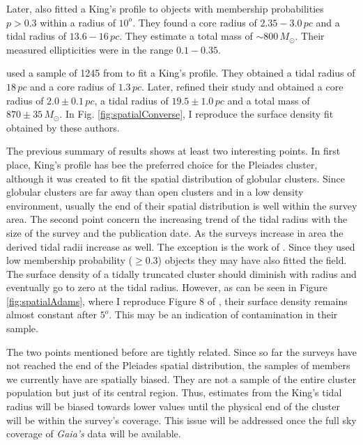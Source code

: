 Later, \citet{Adams2001} also fitted a King's profile to objects with membership probabilities $p>0.3$ within a radius of $10^o$. They found a core radius of $2.35-3.0\,pc$ and a tidal radius of $13.6-16\,pc$. They estimate a total mass of $\sim 800\,M_{\odot}$. Their measured ellipticities were in the range $0.1-0.35$. 

\citet{Converse2008} used a sample of 1245 from \citet{Stauffer2007} to fit a King's profile. They obtained a tidal radius of $18\,pc$ and a core radius of  $1.3 \,pc$. Later, \citet{Converse2010} refined their study and obtained a core radius of $2.0\pm0.1\,pc$, a tidal radius of $19.5 \pm 1.0 \,pc $ and a total mass of $870\pm35\,M_{\odot}$. In Fig. \ref{fig:spatialConverse}, I reproduce the surface density fit obtained by these authors.

The previous summary of results shows at least two interesting points. In first place, King's profile \citep{King1962} has bee the preferred choice for the Pleiades cluster, although it was created to fit the spatial distribution of globular clusters. Since globular clusters are far away than open clusters and in a low density environment, usually the end of their spatial distribution is well within the survey area. The second point concern the increasing trend of the tidal radius with the size of the survey and the publication date. As the surveys increase in area the derived tidal radii increase as well. The exception is the work of \citet{Adams2001}. Since they used low membership probability ($\geq0.3$) objects they may have also fitted the field. The surface density of a tidally truncated cluster should diminish with radius and eventually go to zero at the tidal radius. However, as can be seen in Figure \ref{fig:spatialAdams}, where I reproduce Figure 8 of \citet{Adams2001}, their surface density remains almost constant after $5^o$. This may be an indication of contamination in their sample.

The two points mentioned before are tightly related. Since so far the surveys have not reached the end of the Pleiades spatial distribution, the samples of members we currently have are spatially biased. They are not a sample of the entire cluster population but just of its central region. Thus, estimates from the King's tidal radius will be biased towards lower values until the physical end of the cluster will be within the survey's coverage. This issue will be addressed once the full sky coverage of \emph{Gaia's} data will be available.

